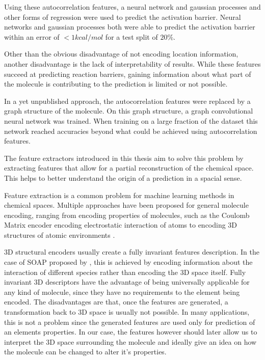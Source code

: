 Using these autocorrelation features, a neural network and gaussian processes and other forms of regression were used to predict the activation barrier.
Neural networks and gaussian processes both were able to predict the activation barrier within an error of $<1 kcal/mol$ for a test split of $20\%$. %

Other than the obvious disadvantage of not encoding location information, another disadvantage is the lack of interpretability of results.
While these features succeed at predicting reaction barriers, gaining 
information about what part of the molecule is contributing to the prediction is limited or not possible.

In a yet unpublished approach, the autocorrelation features were replaced by a graph structure of the molecule.
On this graph structure, a graph convolutional neural network was trained.
When training on a large fraction of the dataset this network reached accuracies 
beyond what could be achieved using autocorrelation features.

The feature extractors introduced in this thesis aim to solve this problem by extracting features that allow for a
partial reconstruction of the chemical space.
This helps to better understand the origin of a prediction in a spacial sense.

Feature extraction is a common problem for machine learning methods in chemical spaces.
Multiple approaches have been proposed for general molecule encoding, 
ranging from encoding properties of molecules, such as the Coulomb Matrix encoder encoding electrostatic interaction of atoms \cite{PhysRevLett.108.058301}
to encoding 3D structures of atomic environments \cite{Bart_k_2013}.

3D structural encoders usually create a fully invariant features description.
In the case of SOAP proposed by \citeauthor{Bart_k_2013}, this is achieved by encoding information about the interaction of 
different species rather than encoding the 3D space itself.
Fully invariant 3D descriptors have the advantage of being universally applicable for any kind of molecule, since they have no requirements to the element being encoded.
The disadvantages are that, once the features are generated, a transformation back to 3D space is usually not possible.
In many applications, this is not a problem since the generated features are used only for prediction of an elements properties.
In our case, the features however should later allow us to interpret the 3D space surrounding the molecule and ideally give an idea on how the molecule can be changed to alter it's properties.

